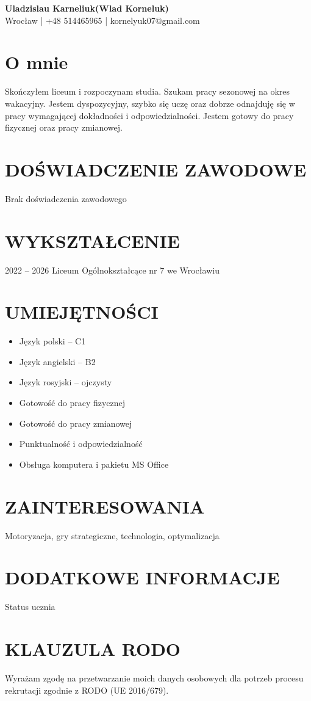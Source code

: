\documentclass[a4paper,10pt]{article}
\begin{document}
\begin{center}
	{\LARGE \textbf{Uladzislau Karneliuk(Wlad Korneluk)}}\\
	Wrocław | +48 514465965 | kornelyuk07@gmail.com
\end{center}

\section*{O mnie}

Skończyłem liceum i rozpoczynam studia. Szukam pracy sezonowej na okres wakacyjny. Jestem dyspozycyjny, szybko się uczę oraz dobrze odnajduję się w pracy wymagającej dokładności i odpowiedzialności. Jestem gotowy do pracy fizycznej oraz pracy zmianowej.

\section*{DOŚWIADCZENIE ZAWODOWE}
Brak doświadczenia zawodowego

\section*{WYKSZTAŁCENIE}
2022 – 2026
Liceum Ogólnokształcące nr 7 we Wrocławiu

\section*{UMIEJĘTNOŚCI}
\begin{itemize}[noitemsep]
	\item Język polski – C1
        \item Język angielski – B2
        \item Język rosyjski – ojczysty
        \item Gotowość do pracy fizycznej
        \item Gotowość do pracy zmianowej
        \item Punktualność i odpowiedzialność
        \item Obsługa komputera i pakietu MS Office
\end{itemize}

\section*{ZAINTERESOWANIA}
Motoryzacja, gry strategiczne, technologia, optymalizacja

\section*{DODATKOWE INFORMACJE}
Status ucznia

\section*{KLAUZULA RODO}
Wyrażam zgodę na przetwarzanie moich danych osobowych dla potrzeb procesu rekrutacji zgodnie z RODO (UE 2016/679).
\end{document}
